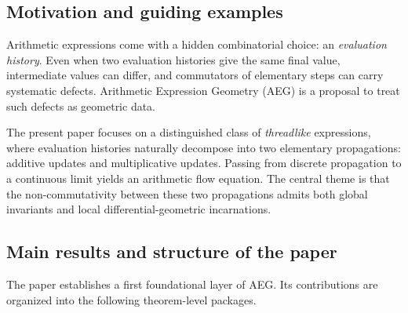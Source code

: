 
\subsection{Motivation and guiding examples}\label{subsec:intro-motivation}

Arithmetic expressions come with a hidden combinatorial choice: an \emph{evaluation history}. Even when two evaluation histories give the same final value, intermediate values can differ, and commutators of elementary steps can carry systematic defects. Arithmetic Expression Geometry (AEG) is a proposal to treat such defects as geometric data.

The present paper focuses on a distinguished class of \emph{threadlike} expressions, where evaluation histories naturally decompose into two elementary propagations: additive updates and multiplicative updates. Passing from discrete propagation to a continuous limit yields an arithmetic flow equation. The central theme is that the non-commutativity between these two propagations admits both global invariants and local differential-geometric incarnations.

\subsection{Main results and structure of the paper}\label{subsec:intro-results}

The paper establishes a first foundational layer of AEG. Its contributions are organized into the following theorem-level packages.

